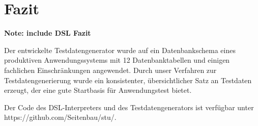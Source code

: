 \section{Fazit}

\textbf{Note: include DSL Fazit}

Der entwickelte Testdatengenerator wurde auf ein Datenbankschema eines produktiven Anwendungssystems mit 12 Datenbanktabellen und einigen fachlichen Einschränkungen angewendet. Durch unser Verfahren zur Testdatengenerierung wurde ein konsistenter, übersichtlicher Satz an Testdaten erzeugt, der eine gute Startbasis für Anwendungstest bietet.

Der Code des DSL-Interpreters und des Testdatengenerators ist verfügbar unter https://github.com/Seitenbau/stu/.